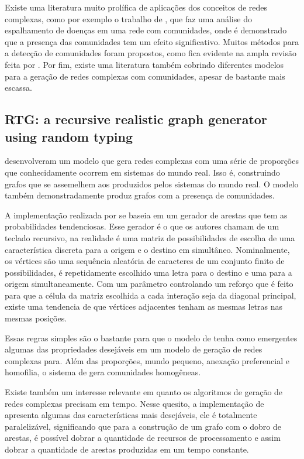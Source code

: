 \documentclass[notes.tex]{subfiles}
\begin{document}
Existe uma literatura muito prolífica de aplicações dos conceitos de redes complexas, como por exemplo o trabalho de , que faz uma análise do espalhamento de doenças em uma rede com comunidades, onde é demonstrado que a presença das comunidades tem um efeito significativo.
Muitos métodos para a detecção de comunidades foram propostos, como fica evidente na ampla revisão feita por .
Por fim, existe uma literatura também cobrindo diferentes modelos para a geração de redes complexas com comunidades, apesar de bastante mais escassa.

\subsection{RTG: a recursive realistic graph generator using random typing}

 desenvolveram um modelo que gera redes complexas com uma série de proporções que conhecidamente ocorrem em sistemas do mundo real.
Isso é, construindo grafos que se assemelhem aos produzidos pelos sistemas do mundo real.
O modelo também demonstradamente produz grafos com a presença de comunidades.

A implementação realizada por  se baseia em um gerador de arestas que tem as probabilidades tendenciosas.
Esse gerador é o que os autores chamam de um teclado recursivo, na realidade é uma matriz de possibilidades de escolha de uma característica discreta para a origem e o destino em simultâneo.
Nominalmente, os vértices são uma sequência aleatória de caracteres de um conjunto finito de possibilidades, é repetidamente escolhido uma letra para o destino e uma para a origem simultaneamente.
Com um parâmetro controlando um reforço que é feito para que a célula da matriz escolhida a cada interação seja da diagonal principal, existe uma tendencia de que vértices adjacentes tenham as mesmas letras nas mesmas posições.

Essas regras simples são o bastante para que o modelo de  tenha como emergentes algumas das propriedades desejáveis em um modelo de geração de redes complexas para.
Além das proporções, mundo pequeno, anexação preferencial e homofilia, o sistema de  gera comunidades homogêneas.

Existe também um interesse relevante em quanto os algoritmos de geração de redes complexas precisam em tempo.
Nesse quesito, a implementação de  apresenta algumas das características mais desejáveis, ele é totalmente paralelizável, significando que para a construção de um grafo com o dobro de arestas, é possível dobrar a quantidade de recursos de processamento e assim dobrar a quantidade de arestas produzidas em um tempo constante.
\end{document}
